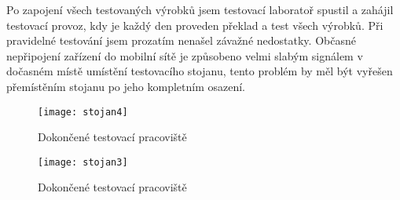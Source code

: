 Po zapojení všech testovaných výrobků jsem testovací laboratoř spustil a zahájil testovací provoz, kdy je každý den proveden překlad a test všech výrobků. Při pravidelné testování jsem prozatím nenašel závažné nedostatky. Občasné nepřipojení zařízení do mobilní sítě je způsobeno velmi slabým signálem v dočasném místě umístění testovacího stojanu, tento problém by měl být vyřešen přemístěním stojanu po jeho kompletním osazení.

\begin{figure}[h]
  \centering
  \texttt{[image: stojan4]}
  \caption{Dokončené testovací pracoviště}
  \label{fig:stojan4}
\end{figure}

\begin{figure}[h]
  \centering
  \texttt{[image: stojan3]}
  \caption{Dokončené testovací pracoviště}
  \label{fig:stojan3}
\end{figure}



\endinput
